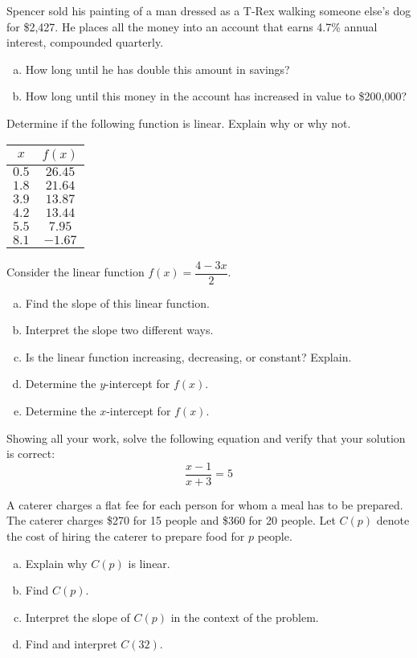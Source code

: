 \documentclass[11pt,letterpaper]{article}
\begin{document}
\prob Spencer sold his painting of a man dressed as a T-Rex walking someone else's dog for \$2,427. He places all the money into an account that earns 4.7\% annual interest, compounded quarterly. 
	\begin{enumerate}[(a)]
	\item How long until he has double this amount in savings?
	\item How long until this money in the account has increased in value to \$200,000?
	\end{enumerate} \pspace
	
	
\prob Determine if the following function is linear. Explain why or why not.
	\begin{table}[!ht]
	\centering
	\begin{tabular}{c|c}
	$x$ & $f(x)$ \\ \hline
	$0.5$ & $26.45$ \\
	$1.8$ & $21.64$ \\
	$3.9$ & $13.87$ \\
	$4.2$ & $13.44$ \\
	$5.5$ & $7.95$ \\
	$8.1$ & $-1.67$
	\end{tabular}
	\end{table} \pspace	
	
	
\prob Consider the linear function $f(x)= \dfrac{4 - 3x}{2}$.
	\begin{enumerate}[(a)]
	\item Find the slope of this linear function. 
	\item Interpret the slope two different ways.
	\item Is the linear function increasing, decreasing, or constant? Explain. 
	\item Determine the $y$-intercept for $f(x)$.
	\item Determine the $x$-intercept for $f(x)$.
	\end{enumerate} \pspace 	
	
	
\prob Showing all your work, solve the following equation and verify that your solution is correct:
	\[
	\dfrac{x - 1}{x + 3}= 5
	\] \pspace
	
	
\prob A caterer charges a flat fee for each person for whom a meal has to be prepared. The caterer charges \$270 for 15 people and \$360 for 20 people. Let $C(p)$ denote the cost of hiring the caterer to prepare food for $p$ people. 
	\begin{enumerate}[(a)]
	\item Explain why $C(p)$ is linear.
	\item Find $C(p)$.
	\item Interpret the slope of $C(p)$ in the context of the problem. 
	\item Find and interpret $C(32)$. 
	\end{enumerate} \pspace	
	
\end{document}
